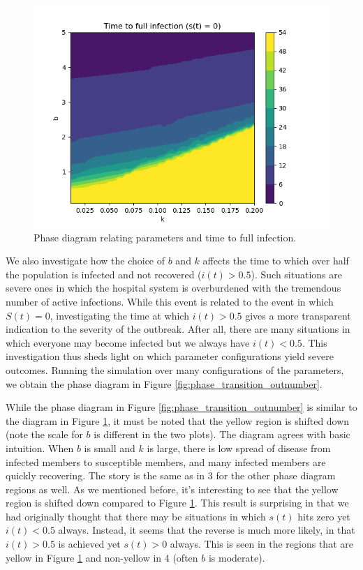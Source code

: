 \documentclass[12pt, reqno]{amsart}
\begin{document}
    \begin{figure}
        \centering
        \includegraphics[scale=0.8]{phase_transition_full_infection.png}
        \caption{Phase diagram relating parameters and time to full infection.}
        \label{fig:phase_transition_full_infection}
    \end{figure}

    We also investigate how the choice of \(b\) and \(k\) affects the time to which over half the population is infected and not recovered (\(i(t) > 0.5\)). Such situations are severe ones in which the hospital system is overburdened with the tremendous number of active infections. While this event is related to the event in which \(S(t) = 0\), investigating the time at which \(i(t) > 0.5\) gives a more transparent indication to the severity of the outbreak. After all, there are many situations in which everyone may become infected but we always have \(i(t) < 0.5\). This investigation thus sheds light on which parameter configurations yield severe outcomes. Running the simulation over many configurations of the parameters, we obtain the phase diagram in Figure \ref{fig:phase_transition_outnumber}.

    While the phase diagram in Figure \ref{fig:phase_transition_outnumber} is similar to the diagram in Figure \ref{fig:phase_transition_full_infection}, it must be noted that the yellow region is shifted down (note the scale for \(b\) is different in the two plots). The diagram agrees with basic intuition. When \(b\) is small and \(k\) is large, there is low spread of disease from infected members to susceptible members, and many infected members are quickly recovering. The story is the same as in 3 for the other phase diagram regions as well. As we mentioned before, it's interesting to see that the yellow region is shifted down compared to Figure \ref{fig:phase_transition_full_infection}. This result is surprising in that we had originally thought that there may be situations in which \(s(t)\) hits zero yet \(i(t) < 0.5\) always. Instead, it seems that the reverse is much more likely, in that \(i(t) > 0.5\) is achieved yet \(s(t) > 0\) always. This is seen in the regions that are yellow in Figure \ref{fig:phase_transition_full_infection} and non-yellow in 4 (often \(b\) is moderate). 
\end{document}
